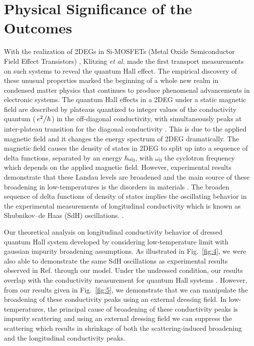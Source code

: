 \documentclass[
 reprint,
 amsmath,amssymb,
 aps,
 prb,
]{revtex4-2}
\begin{document}
{\color{Red}
\section{\label{sec:physical_significance} Physical Significance of the Outcomes}
With the realization of 2DEGs in Si-MOSFETs (Metal Oxide Semiconductor Field Effect Transistors) \citep{fowler66}, Klitzing \textit{et al.} \cite{klitzing80} made the first transport measurements on such systems to reveal the quantum Hall effect. The empirical discovery of these unusual properties marked the beginning of a whole new realm in condensed matter physics that continues to produce phenomenal advancements in electronic systems. The quantum Hall effects in a 2DEG under a static magnetic field are described by plateaus quantized to integer values of the conductivity quantum ($\flatfrac{e^2}{\hbar}$) in the off-diagonal conductivity, with simultaneously peaks at inter-plateau transition for the diagonal conductivity \cite{endo09}. This is due to the applied magnetic field and it changes the energy spectrum of 2DEG dramatically. The magnetic field causes the density of states in 2DEG to split up into a sequence of delta functions, separated by an energy $\hbar\omega_0$, with $\omega_0$ the cyclotron frequency which depends on the applied magnetic field.
However, experimental results demonstrate that these Landau levels are broadened and the main source of these broadening in low-temperatures is the disorders in materials \cite{ando85,dial07}. The broaden sequence of delta functions of density of states implies the oscillating behavior in the experimental measurements of longitudinal conductivity which is known as Shubnikov–de Haas (SdH) oscillations. \cite{endo09,wakabayashi78}.

Our theoretical analysis on longitudinal conductivity behavior of dressed quantum Hall system developed by considering low-temperature limit with gaussian impurity broadening assumptions. As illustrated in Fig.~\ref{fig:4}, we were also able to demonstrate the same SdH oscillations as experimental results observed in Ref.\cite{endo09,wakabayashi78} through our model. Under the undressed condition, our results overlap with the conductivity measurement for quantum Hall systems \cite{endo09}. However, from our results given in Fig.~\ref{fig:5}, we demonstrate that we can manipulate the broadening of these conductivity peaks using an external dressing field. In low-temperatures, the principal cause of broadening of these conductivity peaks is impurity scattering and using an external dressing field we can suppress the scattering which results in shrinkage of both the scattering-induced broadening and the longitudinal conductivity peaks.

}
\end{document}
